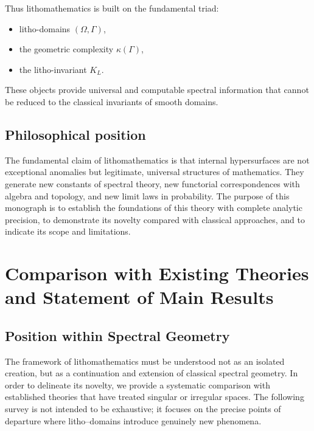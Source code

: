 Thus lithomathematics is built on the fundamental triad:
\begin{itemize}
  \item litho-domains $(\Omega,\Gamma)$,
  \item the geometric complexity $\kappa(\Gamma)$,
  \item the litho-invariant $K_L$.
\end{itemize}

These objects provide universal and computable spectral information that cannot be reduced 
to the classical invariants of smooth domains. 

\subsection{Philosophical position}

The fundamental claim of lithomathematics is that internal hypersurfaces are 
not exceptional anomalies but legitimate, universal structures of mathematics. 
They generate new constants of spectral theory, 
new functorial correspondences with algebra and topology, 
and new limit laws in probability. 
The purpose of this monograph is to establish the foundations of this theory 
with complete analytic precision, 
to demonstrate its novelty compared with classical approaches, 
and to indicate its scope and limitations. 

\section{Comparison with Existing Theories and Statement of Main Results}

\subsection{Position within Spectral Geometry}

The framework of lithomathematics must be understood not as an isolated creation,
but as a continuation and extension of classical spectral geometry. 
In order to delineate its novelty, we provide a systematic comparison with 
established theories that have treated singular or irregular spaces. 
The following survey is not intended to be exhaustive; it focuses on the 
precise points of departure where litho--domains introduce genuinely new phenomena.

